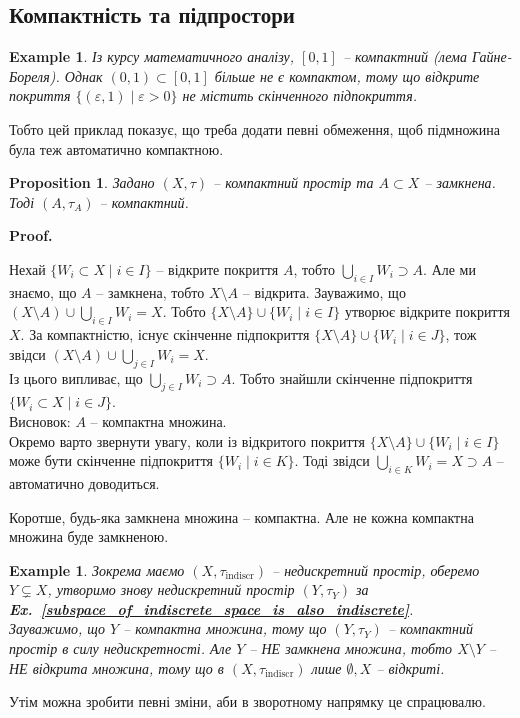 \documentclass[a4paper, 10pt]{article}
\makeatletter
\theoremstyle{theoremdd}
\newtheorem{example}[theorem]{Example}
\newtheorem{proposition}[theorem]{Proposition}
\newcommand\exref[1]{\textbf{Ex.~\ref{#1}}}
\renewenvironment{proof}[1][Proof.\\]{\par
\pushQED{\hfill \qed}%
\normalfont \topsep6\p@\@plus6\p@\relax
\trivlist
\item\relax
{\bfseries
#1\@addpunct{.}}\hspace\labelsep\ignorespaces
}{%
\popQED\endtrivlist\@endpefalse
}
\makeatother
\begin{document}
\subsection{Компактність та підпростори}
\begin{example}
Із курсу математичного аналізу, $[0,1]$ -- компактний (лема Гайне-Бореля). Однак $(0,1) \subset [0,1]$ більше не є компактом, тому що відкрите покриття $\{(\varepsilon,1) \mid \varepsilon > 0\}$ не містить скінченного підпокриття.
\end{example}
\noindent
Тобто цей приклад показує, що треба додати певні обмеження, щоб підмножина була теж автоматично компактною.

\begin{proposition}
Задано $(X,\tau)$ -- компактний простір та $A \subset X$ -- замкнена. Тоді $(A,\tau_A)$ -- компактний.
\end{proposition}

\begin{proof}
Нехай $\{W_i \subset X \mid i \in I\}$ -- відкрите покриття $A$, тобто $\displaystyle\bigcup_{i \in I} W_i \supset A$. Але ми знаємо, що $A$ -- замкнена, тобто $X \setminus A$ -- відкрита. Зауважимо, що $\displaystyle (X \setminus A) \cup \bigcup_{i \in I} W_i = X$. Тобто $\{X \setminus A\} \cup \{W_i \mid i \in I\}$ утворює відкрите покриття $X$. За компактністю, існує скінченне підпокриття $\{X \setminus A\} \cup \{W_i \mid i \in J\}$, тож звідси $\displaystyle (X \setminus A) \cup \bigcup_{j \in I} W_i = X$.\\
Із цього випливає, що $\displaystyle\bigcup_{j \in I} W_i \supset A$. Тобто знайшли скінченне підпокриття $\{W_i \subset X \mid i \in J\}$.\\
Висновок: $A$ -- компактна множина.
\bigskip \\
Окремо варто звернути увагу, коли із відкритого покриття $\{X \setminus A\} \cup \{W_i \mid i \in I\}$ може бути скінченне підпокриття $\{W_i \mid i \in K\}$. Тоді звідси $\displaystyle\bigcup_{i \in K} W_i = X \supset A$ --  автоматично доводиться.
\end{proof}

\noindent Коротше, будь-яка замкнена множина -- компактна. Але не кожна компактна множина буде замкненою.

\begin{example}
Зокрема маємо $(X,\tau_{\text{indiscr}})$ -- недискретний простір, оберемо $Y \subsetneq X$, утворимо знову недискретний простір $(Y,\tau_Y)$ за \exref{subspace_of_indiscrete_space_is_also_indiscrete}.\\
Зауважимо, що $Y$ -- компактна множина, тому що $(Y,\tau_Y)$ -- компактний простір в силу недискретності. Але $Y$ -- НЕ замкнена множина, тобто $X \setminus Y$ -- НЕ відкрита множина, тому що в $(X,\tau_{\text{indiscr}})$ лише $\emptyset,X$ -- відкриті.
\end{example}
\noindent
Утім можна зробити певні зміни, аби в зворотному напрямку це спрацювалю.
\end{document}
